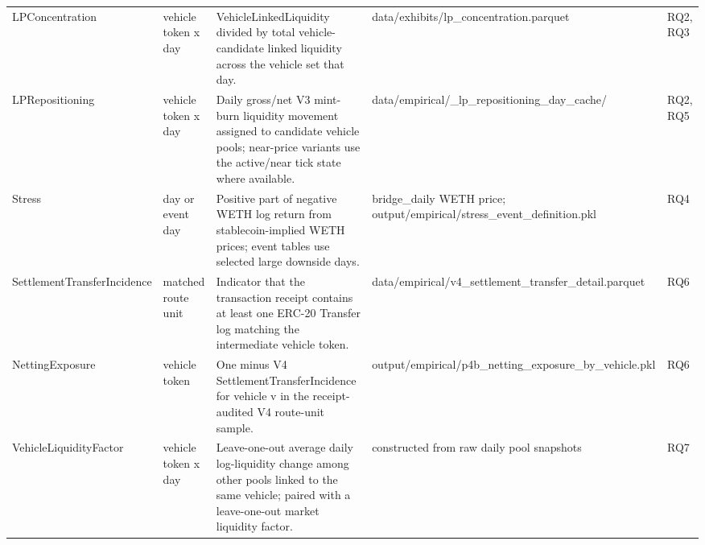 \begin{tabularx}{\linewidth}{@{}>{\raggedright\arraybackslash}X>{\raggedright\arraybackslash}X>{\raggedright\arraybackslash}X>{\raggedright\arraybackslash}X>{\raggedright\arraybackslash}X@{}}
LPConcentration & vehicle token x day & VehicleLinkedLiquidity divided by total vehicle-candidate linked liquidity across the vehicle set that day. & data/\allowbreak{}exhibits/\allowbreak{}lp\_\allowbreak{}concentration.parquet & RQ2, RQ3 \\
LPRepositioning & vehicle token x day & Daily gross/\allowbreak{}net V3 mint-burn liquidity movement assigned to candidate vehicle pools; near-price variants use the active/\allowbreak{}near tick state where available. & data/\allowbreak{}empirical/\allowbreak{}\_\allowbreak{}lp\_\allowbreak{}repositioning\_\allowbreak{}day\_\allowbreak{}cache/\allowbreak{} & RQ2, RQ5 \\
Stress & day or event day & Positive part of negative WETH log return from stablecoin-implied WETH prices; event tables use selected large downside days. & bridge\_\allowbreak{}daily WETH price; output/\allowbreak{}empirical/\allowbreak{}stress\_\allowbreak{}event\_\allowbreak{}definition.pkl & RQ4 \\
SettlementTransferIncidence & matched route unit & Indicator that the transaction receipt contains at least one ERC-20 Transfer log matching the intermediate vehicle token. & data/\allowbreak{}empirical/\allowbreak{}v4\_\allowbreak{}settlement\_\allowbreak{}transfer\_\allowbreak{}detail.parquet & RQ6 \\
NettingExposure & vehicle token & One minus V4 SettlementTransferIncidence for vehicle v in the receipt-audited V4 route-unit sample. & output/\allowbreak{}empirical/\allowbreak{}p4b\_\allowbreak{}netting\_\allowbreak{}exposure\_\allowbreak{}by\_\allowbreak{}vehicle.pkl & RQ6 \\
VehicleLiquidityFactor & vehicle token x day & Leave-one-out average daily log-liquidity change among other pools linked to the same vehicle; paired with a leave-one-out market liquidity factor. & constructed from raw daily pool snapshots & RQ7 \\
\bottomrule
\end{tabularx}
